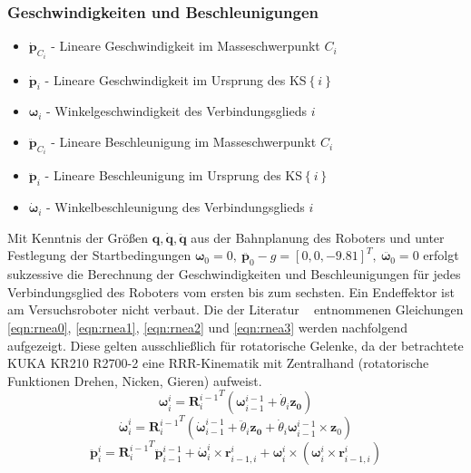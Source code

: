 \subsubsection*{Geschwindigkeiten und Beschleunigungen}
\begin{itemize}
	\item $ \dot{\boldsymbol{p}}_{C_i} $ - Lineare Geschwindigkeit im Masseschwerpunkt $ C_i $ 
	\item $ \dot{\boldsymbol{p}}_i $ - Lineare Geschwindigkeit im Ursprung des KS$\left\{i\right\}$
	\item $ \boldsymbol{\omega}_i $ - Winkelgeschwindigkeit des Verbindungsglieds $i$
	\item $ \ddot{\boldsymbol{p}}_{C_i} $ - Lineare Beschleunigung im Masseschwerpunkt $ C_i $
	\item $ \ddot{\boldsymbol{p}}_i $ - Lineare Beschleunigung im Ursprung des KS$\left\{i\right\}$
	\item $ \boldsymbol{\dot{\omega}}_i $ - Winkelbeschleunigung des Verbindungsglieds $i$
\end{itemize}
%
Mit Kenntnis der Größen $\bm{q}, \dot{\bm{q}}, \ddot{\bm{q}}$ aus der Bahnplanung des Roboters und unter Festlegung der Startbedingungen $\bm{\omega}_0 = 0,~ \ddot{\bm{p}_0}-g = [0,0,-9.81]^T,~ \ddot{\bm{\omega}_0} = 0$  erfolgt sukzessive die Berechnung der Geschwindigkeiten und Beschleunigungen für jedes Verbindungsglied des Roboters vom ersten bis zum sechsten. Ein Endeffektor ist am Versuchsroboter nicht verbaut. Die der Literatur ~\autocite[S.~287~f.]{Grimble.2009} entnommenen Gleichungen \ref{eqn:rnea0}, \ref{eqn:rnea1}, \ref{eqn:rnea2} und  \ref{eqn:rnea3} werden nachfolgend aufgezeigt. Diese gelten ausschließlich für rotatorische Gelenke, da der betrachtete KUKA KR210 R2700-2 eine RRR-Kinematik mit Zentralhand (rotatorische Funktionen Drehen, Nicken, Gieren) aufweist. 
%
\begin{equation}
	\label{eqn:rnea0}
	\bm{\omega}^i_i = {\bm{R}^{i-1}_i}^T  \left( \bm{\omega}^{i-1}_{i-1} +\dot{\theta}_i\bm{z_0} \right)
\end{equation}
%
\begin{equation}
	\label{eqn:rnea1}
	\dot{\bm{\omega}}^i_i = {\bm{R}^{i-1}_i}^T  \left( \dot{\bm{\omega}}^{i-1}_{i-1} +\ddot{\theta}_i\bm{z_0} +\dot{{\theta}}_i\bm{\omega}^{i-1}_{i-1} \times \bm{z}_0 \right)
\end{equation}
%
\begin{equation}
	\label{eqn:rnea2}
	\ddot{\bm{p}}^i_i = {\bm{R}^{i-1}_i}^T  \ddot{\bm{p}}^{i-1}_{i-1} + \dot{\bm{\omega}}^{i}_{i} \times \bm{r}^{i}_{i-1,i} + {\bm{\omega}}^{i}_{i} \times \left(  {\bm{\omega}}^{i}_{i} \times \bm{r}^{i}_{i-1,i} \right)
\end{equation}

